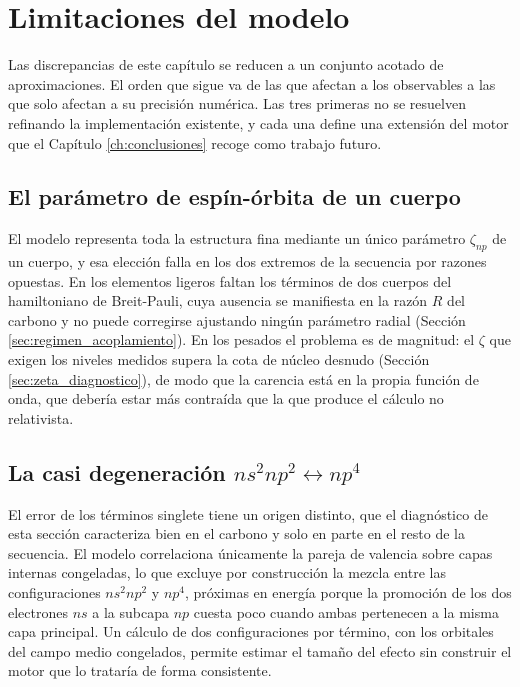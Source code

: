 \section{Limitaciones del modelo}
\label{sec:limitaciones}

Las discrepancias de este capítulo se reducen a un conjunto acotado de aproximaciones. El orden que sigue va de las que afectan a los observables a las que solo afectan a su precisión numérica. Las tres primeras no se resuelven refinando la implementación existente, y cada una define una extensión del motor que el Capítulo \ref{ch:conclusiones} recoge como trabajo futuro.

\subsection{El parámetro de espín-órbita de un cuerpo}

El modelo representa toda la estructura fina mediante un único parámetro $\zeta_{np}$ de un cuerpo, y esa elección falla en los dos extremos de la secuencia por razones opuestas. En los elementos ligeros faltan los términos de dos cuerpos del hamiltoniano de Breit-Pauli, cuya ausencia se manifiesta en la razón $R$ del carbono y no puede corregirse ajustando ningún parámetro radial (Sección \ref{sec:regimen_acoplamiento}). En los pesados el problema es de magnitud: el $\zeta$ que exigen los niveles medidos supera la cota de núcleo desnudo (Sección \ref{sec:zeta_diagnostico}), de modo que la carencia está en la propia función de onda, que debería estar más contraída que la que produce el cálculo no relativista.

\subsection{La casi degeneración \texorpdfstring{$ns^2np^2 \leftrightarrow np^4$}{ns2np2 <-> np4}}
\label{sec:casi_degeneracion}

El error de los términos singlete tiene un origen distinto, que el diagnóstico de esta sección caracteriza bien en el carbono y solo en parte en el resto de la secuencia. El modelo correlaciona únicamente la pareja de valencia sobre capas internas congeladas, lo que excluye por construcción la mezcla entre las configuraciones $ns^2np^2$ y $np^4$, próximas en energía porque la promoción de los dos electrones $ns$ a la subcapa $np$ cuesta poco cuando ambas pertenecen a la misma capa principal. Un cálculo de dos configuraciones por término, con los orbitales del campo medio congelados, permite estimar el tamaño del efecto sin construir el motor que lo trataría de forma consistente.

